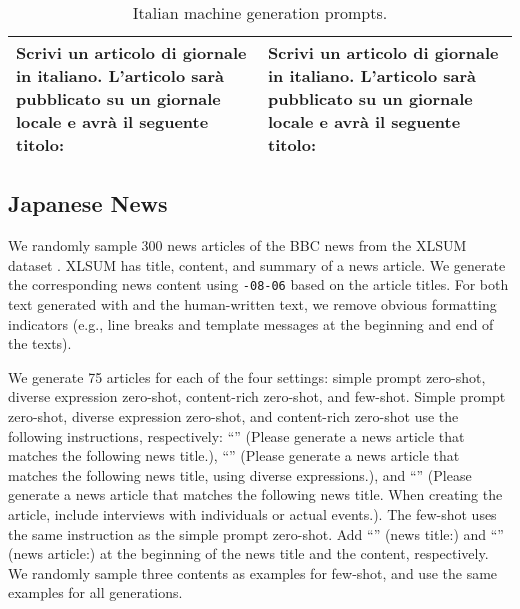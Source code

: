 \begin{table*}[ht]
\begin{tabular}{|p{7cm}|p{7cm}|}
    \cline{1-2}
    Scrivi un articolo di giornale in italiano. L'articolo sarà pubblicato su un giornale locale e avrà il seguente titolo: & Scrivi un articolo di giornale in italiano. L'articolo sarà pubblicato su un giornale locale e avrà il seguente titolo:\\
\hline
\end{tabular}
\caption{Italian machine generation prompts.}
\label{tab:Italian-prompt}
\end{table*}


\subsection{Japanese News}
We randomly sample 300 news articles of the BBC news from the XLSUM dataset \citep{hasan-etal-2021-xl}.
XLSUM has title, content, and summary of a news article.
We generate the corresponding news content using \texttt{-08-06} based on the article titles.
For both text generated with \gptfouro and the human-written text, we remove obvious formatting indicators (e.g., line breaks and template messages at the beginning and end of the texts).

We generate 75 articles for each of the four settings: simple prompt zero-shot, diverse expression zero-shot, content-rich zero-shot, and few-shot.
Simple prompt zero-shot, diverse expression zero-shot, and content-rich zero-shot use the following instructions, respectively: ``'' (Please generate a news article that matches the following news title.), ``'' (Please generate a news article that matches the following news title, using diverse expressions.), and ``'' (Please generate a news article that matches the following news title. When creating the article, include interviews with individuals or actual events.).
The few-shot uses the same instruction as the simple prompt zero-shot.
Add ``'' (news title:) and ``'' (news article:) at the beginning of the news title and the content, respectively.
We randomly sample three contents as examples for few-shot, and use the same examples for all generations.


